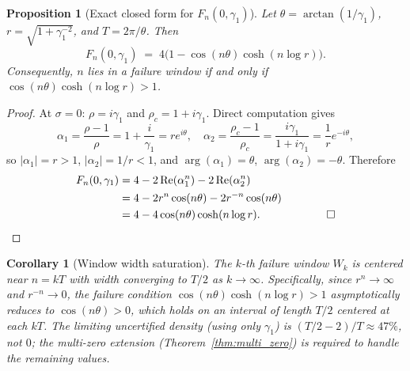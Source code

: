 \documentclass[11pt]{article}
\newtheorem{corollary}[theorem]{Corollary}
\newtheorem{proposition}[theorem]{Proposition}
\begin{document}
\begin{proposition}[Exact closed form for $F_n(0,\gamma_1)$]
\label{prop:closed_form}
Let $\theta = \arctan(1/\gamma_1)$, $r = \sqrt{1 + \gamma_1^{-2}}$, and $T = 2\pi/\theta$.
Then
\[
  F_n(0,\gamma_1) \;=\; 4\bigl(1 - \cos(n\theta)\cosh(n\log r)\bigr).
\]
Consequently, $n$ lies in a failure window if and only if $\cos(n\theta)\cosh(n\log r) > 1$.
\end{proposition}

\begin{proof}
At $\sigma = 0$: $\rho = i\gamma_1$ and $\rho_c = 1 + i\gamma_1$.
Direct computation gives
\[
  \alpha_1 = \frac{\rho - 1}{\rho} = 1 + \frac{i}{\gamma_1} = r e^{i\theta},\quad
  \alpha_2 = \frac{\rho_c - 1}{\rho_c} = \frac{i\gamma_1}{1+i\gamma_1} = \frac{1}{r}e^{-i\theta},
\]
so $|\alpha_1| = r > 1$, $|\alpha_2| = 1/r < 1$, and $\arg(\alpha_1) = \theta$, $\arg(\alpha_2) = -\theta$.
Therefore
\begin{align*}
  F_n(0,\gamma_1) &= 4 - 2\,\mathrm{Re}(\alpha_1^n) - 2\,\mathrm{Re}(\alpha_2^n) \\
  &= 4 - 2r^n\cos(n\theta) - 2r^{-n}\cos(n\theta) \\
  &= 4 - 4\cos(n\theta)\cosh(n\log r). \qquad\qquad \qed
\end{align*}
\end{proof}

\begin{corollary}[Window width saturation]
\label{cor:saturation}
The $k$-th failure window $W_k$ is centered near $n = kT$ with width converging to $T/2$ as $k\to\infty$.
Specifically, since $r^n \to \infty$ and $r^{-n}\to 0$, the failure condition
$\cos(n\theta)\cosh(n\log r) > 1$ asymptotically reduces to $\cos(n\theta) > 0$,
which holds on an interval of length $T/2$ centered at each $kT$.
The limiting uncertified density (using only $\gamma_1$) is $(T/2 - 2)/T \approx 47\%$,
not $0$; the multi-zero extension (Theorem~\ref{thm:multi_zero}) is required to handle
the remaining values.
\end{corollary}
\end{document}
